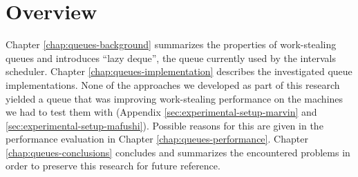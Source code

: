 \section{Overview}
\label{sec:queues-intro-overview}

Chapter \ref{chap:queues-background} summarizes the properties of
work-stealing queues and introduces ``lazy deque'', the queue
currently used by the intervals scheduler. Chapter
\ref{chap:queues-implementation} describes the investigated queue
implementations. None of the approaches we developed as part of this
research yielded a queue that was improving work-stealing performance
on the machines we had to test them with (Appendix
\ref{sec:experimental-setup-marvin} and
\ref{sec:experimental-setup-mafushi}). Possible reasons for this are
given in the performance evaluation in Chapter
\ref{chap:queues-performance}. Chapter \ref{chap:queues-conclusions}
concludes and summarizes the encountered problems in order to preserve
this research for future reference.


